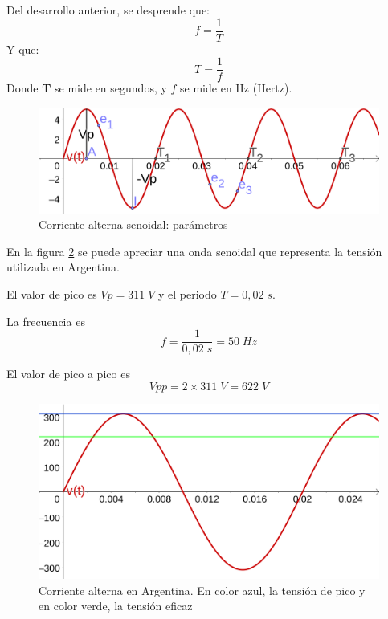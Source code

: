 Del desarrollo anterior, se desprende que:
\begin{equation}
	\label{eq:frec_ciclos}
	f=\frac{1}{T}
\end{equation}
Y que:
\begin{equation}
	\label{eq:ciclos_frec}
	T=\frac{1}{f}
\end{equation}
Donde \textbf{T} se mide en segundos, y \textbf{$f$} se mide en Hz (Hertz).
\begin{figure}[htbp]
  \includegraphics[scale=0.14]{images/ac}
  \caption{Corriente alterna senoidal: parámetros}
  \label{fig:ac}
\end{figure}
\begin{ejemplo}
	\label{ej:ac_argentina}
	En la figura \ref{fig:ac_argentina} se puede apreciar una onda senoidal que representa la tensión utilizada en Argentina.
	
	El valor de pico es $Vp = 311\; V$ y el periodo $T = 0,02\; s$.
	
	La frecuencia es $$f=\frac{1}{0,02\; s}=50\; Hz$$
	
	El valor de pico a pico es $$ Vpp = 2 \times 311\; V = 622\; V $$
\end{ejemplo}
\begin{figure}[htbp]
  \includegraphics[scale=0.1]{images/ac_argentina}
  \caption{Corriente alterna en Argentina. En color azul, la tensión de pico y en color verde, la tensión eficaz}
  \label{fig:ac_argentina}
\end{figure}

